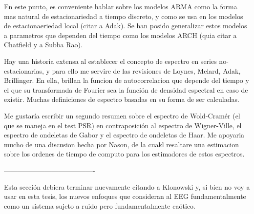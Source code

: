 En este punto, es conveniente hablar sobre los modelos ARMA como la forma mas natural de
estacionariedad a tiempo discreto, y como se usa en los modelos de estacionaeriedad 
local (citar a Adak). Se han posido generalizar estos modelos a parametros que
dependen del tiempo como los modelos ARCH (quia citar a Chatfield y a Subba Rao).

Hay una historia extensa al establecer el concepto de espectro en series no-estacionarias,
y para ello me servire de las revisiones de Loynes, Melard, Adak, Brillinger. En ella,
brillan la funcion de autocorrelacion que depende del tiempo y el que su transformada
de Fourier sea la funci\'on de densidad espectral en caso de existir. Muchas
definiciones de espectro basadas en su forma de ser calculadas.

Me gustar\'ia escribir un segundo resumen sobre el espectro de Wold-Cram\'er (el que se maneja
en el test PSR) en contraposici\'on al espectro de Wigner-Ville, el espectro de
ondeletas de Gabor y el espectro de ondeletas de Haar. Me apoyaria mucho de una discusion
hecha por Nason, de la cuakl resaltare una estimacion sobre los ordenes de tiempo de
computo para los estimadores de estos espectros.

----------------------------------------

Esta secci\'on debiera terminar nuevamente citando a Klonowski y, 
si bien no voy a usar en esta tesis, los
nuevos enfoques que consideran al EEG fundamentalmente como un sistema sujeto a ruido pero
fundamentalmente ca\'otico.

